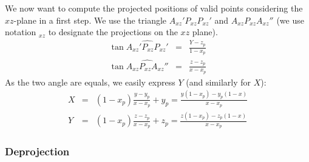   We now want to compute the projected positions of valid points considering the $xz$-plane in a first step.
  We use the triangle $A_{xz}'P_{xz}P_{xz}'$ and $A_{xz}P_{xz}A_{xz}''$ (we use notation $_{xz}$ to designate the projections on the $xz$ plane).
  \begin{eqnarray*}
    \tan\widehat{A_{xz}'P_{xz}P_{xz}'} & = & \frac{Y - z_p}{1 - x_p} \\
    \tan\widehat{A_{xz}P_{xz}A_{xz}''} & = & \frac{z - z_p}{x - x_p}
  \end{eqnarray*}
  As the two angle are equals, we easily express $Y$ (and similarly for $X$):
  \begin{eqnarray}
    X & = & (1 - x_p)\frac{y - y_p}{x - x_p} + y_p = \frac{y (1 - x_p) - y_p (1 - x)}{x - x_p} \label{eq:szp:X} \\
    Y & = & (1 - x_p)\frac{z - z_p}{x - x_p} + z_p = \frac{z (1 - x_p) - z_p (1 - x)}{x - x_p} \label{eq:szp:Y}
  \end{eqnarray}

\subsubsection{Deprojection}

